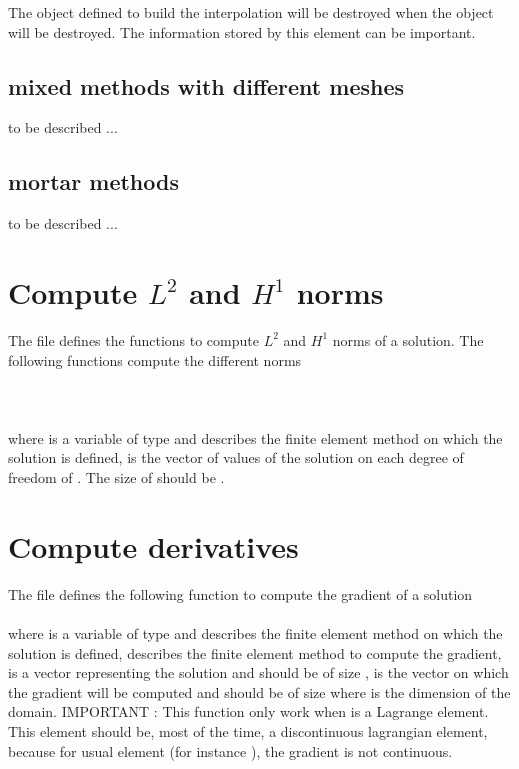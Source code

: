 \documentclass[11pt,a4paper]{article}
\begin{document}
The object defined to build the interpolation will be destroyed when the object  will be destroyed. The information stored by this element can be important.

\subsection{mixed methods with different meshes}
  to be described ...
\subsection{mortar methods}
  to be described ...


\section{Compute $L^2$ and $H^1$ norms}

The file  defines the functions to compute $L^2$ and $H^1$ norms of a solution. The following functions compute the different norms\\[0.5cm]
 \\[0.5cm]
 \\[0.5cm]
 \\[0.5cm]
where  is a variable of type  and describes the finite element method on which the solution is defined,  is the vector of values of the solution on each degree of freedom of . The size of   should be .\\[0.5cm]

\section{Compute derivatives}

The file   defines the following function to compute the gradient of a solution\\[0.5cm]
\\[0.5cm]
where  is a variable of type  and describes the finite element method on which the solution is defined,  describes the finite element method to compute the gradient,  is a vector representing the solution and should be of size ,  is the vector on which the gradient will be computed and should be of size
 where  is the dimension of the domain. IMPORTANT : This function only work when  is a Lagrange element. This element should be, most of the time, a discontinuous lagrangian element, because for usual element (for instance ), the gradient is not continuous.
\end{document}
